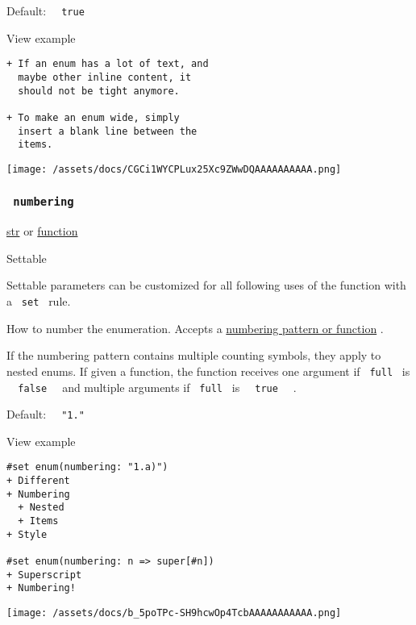Default: \texttt{\ }{\texttt{\ true\ }}\texttt{\ }


View example

\begin{verbatim}
+ If an enum has a lot of text, and
  maybe other inline content, it
  should not be tight anymore.

+ To make an enum wide, simply
  insert a blank line between the
  items.
\end{verbatim}

\texttt{[image: /assets/docs/CGCi1WYCPLux25Xc9ZWwDQAAAAAAAAAA.png]}

\subsubsection{\texorpdfstring{\texttt{\ numbering\ }}{ numbering }}\label{parameters-numbering}

\href{/docs/reference/foundations/str/}{str} {or}
\href{/docs/reference/foundations/function/}{function}

{{ Settable }}

\label{parameters-numbering-settable-tooltip}
Settable parameters can be customized for all following uses of the
function with a \texttt{\ set\ } rule.

How to number the enumeration. Accepts a
\href{/docs/reference/model/numbering/}{numbering pattern or function} .

If the numbering pattern contains multiple counting symbols, they apply
to nested enums. If given a function, the function receives one argument
if \texttt{\ full\ } is \texttt{\ }{\texttt{\ false\ }}\texttt{\ } and
multiple arguments if \texttt{\ full\ } is
\texttt{\ }{\texttt{\ true\ }}\texttt{\ } .

Default: \texttt{\ }{\texttt{\ "1."\ }}\texttt{\ }


View example

\begin{verbatim}
#set enum(numbering: "1.a)")
+ Different
+ Numbering
  + Nested
  + Items
+ Style

#set enum(numbering: n => super[#n])
+ Superscript
+ Numbering!
\end{verbatim}

\texttt{[image: /assets/docs/b\_5poTPc-SH9hcwOp4TcbAAAAAAAAAAA.png]}

